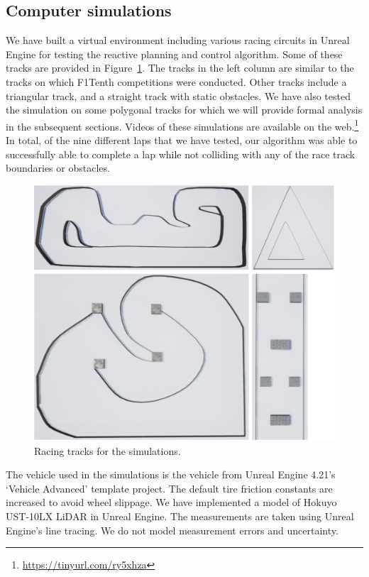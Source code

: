 \subsection{Computer simulations}

We have built a virtual environment including various racing circuits in Unreal Engine for testing the reactive planning and control algorithm.
%
%
Some of these tracks are provided in Figure~\ref{fig:simulation_tracks}.
%
The tracks in the left column are similar to the tracks on which F1Tenth competitions \cite{f1tenth} were conducted.
Other tracks include a triangular track, and a straight track with static obstacles.
%
We have also tested the simulation on some polygonal tracks for which we will provide formal analysis in the subsequent sections.
%
Videos of these simulations are available on the web.\footnote{\url{https://tinyurl.com/ry5xhza}}
%
In total, of the nine different laps that we have tested, our algorithm was able to successfully able to complete a lap while not colliding with any of the race track boundaries or obstacles.

\begin{figure}[!t]
\centering
\includegraphics[width=0.8\columnwidth]{Figures/sim-tracks.png}
\caption{Racing tracks for the simulations.}
\label{fig:simulation_tracks}
\end{figure}

The vehicle used in the simulations is the vehicle from Unreal Engine 4.21's `Vehicle Advanced' template project.
The default tire friction constants are increased to avoid wheel slippage.
We have implemented a model of Hokuyo UST-10LX LiDAR in Unreal Engine.
The measurements are taken using Unreal Engine's line tracing.
We do not model measurement errors and uncertainty.


